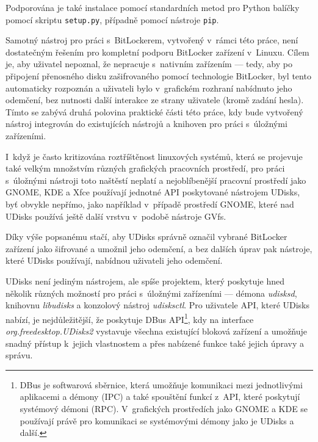 Podporována je také instalace pomocí standardních metod pro Python balíčky pomocí skriptu \texttt{setup.py}, případně pomocí nástroje \texttt{pip}.

\label{sec:integrace}

Samotný nástroj pro práci s~BitLockerem, vytvořený v~rámci této práce, není dos\-ta\-teč\-ným řešením pro kompletní podporu BitLocker zařízení v~Linuxu. Cílem je, aby uživatel nepoznal, že nepracuje s~nativním zařízením --- tedy, aby po připojení přenosného disku zašifrovaného pomocí technologie BitLocker, byl tento automaticky rozpoznán a uživateli bylo v~grafickém rozhraní nabídnuto jeho odemčení, bez nutnosti další interakce ze strany uživatele (kromě zadání hesla). Tímto se zabývá druhá polovina praktické části této práce, kdy bude vytvořený nástroj integrován do existujících nástrojů a knihoven pro práci s~úložnými zařízeními.

\label{sec:udisks}

I~když je často kritizována roztříštěnost linuxových systémů, která se projevuje také velkým množstvím různých grafických pracovních prostředí, pro práci s~úložnými ná\-stro\-ji toto naštěstí neplatí a nejoblíbenější pracovní prostředí jako GNOME, KDE a Xfce používají jednotné API poskytované nástrojem UDisks, byť obvykle nepřímo, jako například v~případě prostředí GNOME, které nad UDisks používá ještě další vrstvu v~podobě nástroje GVfs\cite{GVfs2019}.

Díky výše popsanému stačí, aby UDisks správně označil vybrané BitLocker zařízení jako šifrované a umožnil jeho odemčení, a bez dalších úprav pak nástroje, které UDisks používají, nabídnou uživateli jeho odemčení.

UDisks není jediným nástrojem, ale spíše projektem, který poskytuje hned několik různých možností pro práci s~úložnými zařízeními --- démona \emph{udisksd}, knihovnu \emph{libudisks} a konzolový nástroj \emph{udisksctl}\cite{UDisks2018}. Pro uživatele API, které UDisks nabízí, je nejdůležitější, že poskytuje DBus API\footnote{DBus je softwarová sběrnice, která umožňuje komunikaci mezi jednotlivými aplikacemi a démony (IPC) a také spouštění funkcí z~API, které poskytují systémový démoni (RPC). V~grafických prostředích jako GNOME a KDE se používají právě pro komunikaci se systémovými démony jako je UDisks a další.\cite{Palmieri2005}}, kdy na interface \emph{org.freedesktop.UDisks2} vystavuje všechna existující bloková zařízení a umožňuje snadný přístup k~jejich vlastnostem a přes nabízené funkce také jejich úpravy a správu.

